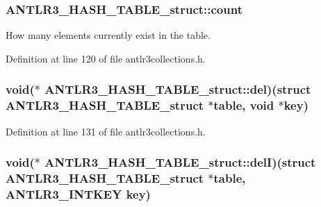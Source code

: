 \hypertarget{struct_a_n_t_l_r3___h_a_s_h___t_a_b_l_e__struct_ae9d4259b466763b862cabec5499158a1}{
\subsubsection[{count}]{ A\-N\-T\-L\-R3\-\_\-\-H\-A\-S\-H\-\_\-\-T\-A\-B\-L\-E\-\_\-struct\-::count}}\label{struct_a_n_t_l_r3___h_a_s_h___t_a_b_l_e__struct_ae9d4259b466763b862cabec5499158a1}
How many elements currently exist in the table. 

Definition at line 120 of file antlr3collections.\-h.

\hypertarget{struct_a_n_t_l_r3___h_a_s_h___t_a_b_l_e__struct_a86f75baae8af4bd647ec057702b5cb8c}{
\subsubsection[{del}]{\setlength{\rightskip}{0pt plus 5cm}void($\ast$ A\-N\-T\-L\-R3\-\_\-\-H\-A\-S\-H\-\_\-\-T\-A\-B\-L\-E\-\_\-struct\-::del)(struct {\bf A\-N\-T\-L\-R3\-\_\-\-H\-A\-S\-H\-\_\-\-T\-A\-B\-L\-E\-\_\-struct} $\ast$table, void $\ast$key)}}\label{struct_a_n_t_l_r3___h_a_s_h___t_a_b_l_e__struct_a86f75baae8af4bd647ec057702b5cb8c}


Definition at line 131 of file antlr3collections.\-h.

\hypertarget{struct_a_n_t_l_r3___h_a_s_h___t_a_b_l_e__struct_ade4f7f8ff2754fd61608f971f41ebfa0}{
\subsubsection[{del\-I}]{\setlength{\rightskip}{0pt plus 5cm}void($\ast$ A\-N\-T\-L\-R3\-\_\-\-H\-A\-S\-H\-\_\-\-T\-A\-B\-L\-E\-\_\-struct\-::del\-I)(struct {\bf A\-N\-T\-L\-R3\-\_\-\-H\-A\-S\-H\-\_\-\-T\-A\-B\-L\-E\-\_\-struct} $\ast$table, {\bf A\-N\-T\-L\-R3\-\_\-\-I\-N\-T\-K\-E\-Y} key)}}\label{struct_a_n_t_l_r3___h_a_s_h___t_a_b_l_e__struct_ade4f7f8ff2754fd61608f971f41ebfa0}


